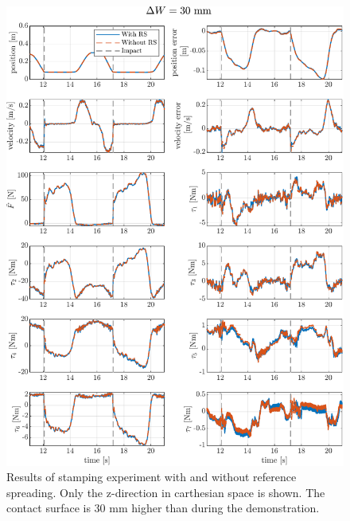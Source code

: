 \documentclass[11pt]{report}
\numberwithin{equation}{section}        %
\numberwithin{figure}{section}          %
\numberwithin{table}{section}           %
\begin{document}
 \begin{figure}[]
  \centering
  \begin{adjustwidth}{0pt}{5pt}
  \includegraphics[right]{Graphics/result30mm.pdf}

  \end{adjustwidth}
  \caption{Results of stamping experiment with and without reference spreading. Only the z-direction in carthesian space is shown. The contact surface is 30 mm higher than during the demonstration.}
  \label{fig:results_30mm}
  \end{figure}

  \newpage
  \printbibliography[title=References]

  \newpage
  \thispagestyle{empty} \ \newpage
\end{document}
